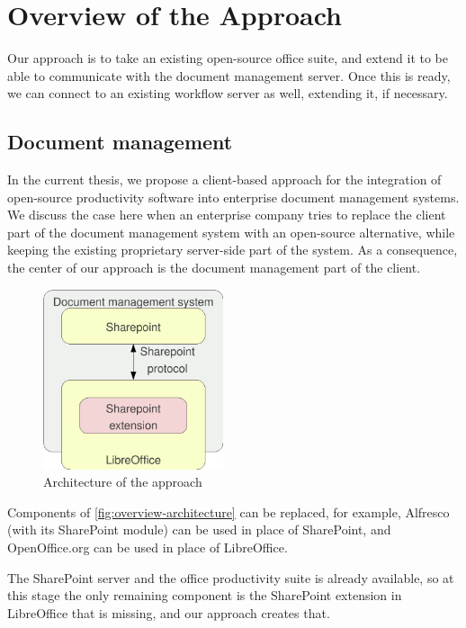 \chapter{Overview of the Approach}
\label{chap:overview}

Our approach is to take an existing open-source office suite, and extend it to
be able to communicate with the document management server. Once this is ready,
we can connect to an existing workflow server as well, extending it, if
necessary.

\section{Document management}

In the current thesis, we propose a client-based approach for the integration
of open-source productivity software into enterprise document management systems.
We discuss the case here when an enterprise company tries to replace the client
part of the document management system with an open-source alternative, while
keeping the existing proprietary server-side part of the system. As a
consequence, the center of our approach is the document management
part of the client.

\begin{figure}[H]
\centering
\includegraphics[width=200px,keepaspectratio]{overview-architecture.pdf}
\caption{Architecture of the approach}
\label{fig:overview-architecture}
\end{figure}

Components of \autoref{fig:overview-architecture} can be replaced, for example, Alfresco (with
its SharePoint module) can be used in place of SharePoint, and OpenOffice.org
can be used in place of LibreOffice.

The SharePoint server and the office productivity suite is already available, so
at this stage the only remaining component is the SharePoint extension in
LibreOffice that is missing, and our approach creates that.

